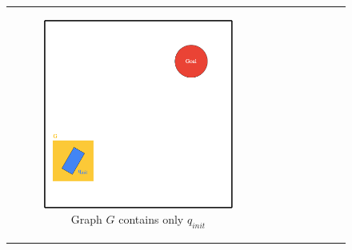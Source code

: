
\begin{figure}[H]
\begin{center}
\begin{tabular}{c c}

    \begin{subfigure}{0.45\textwidth}
    \includegraphics[draft=false,width=\linewidth]{chapters/chapter2/img/RRT_step_by_step-A.png}
    \caption{Graph $G$ contains only $q_{init}$ \newline}
    \label{subfig:rrt-step-by-step-A}
    \end{subfigure} &
    \begin{subfigure}{0.45\textwidth}

\end{subfigure}
\end{tabular}
\end{center}
\end{figure}
